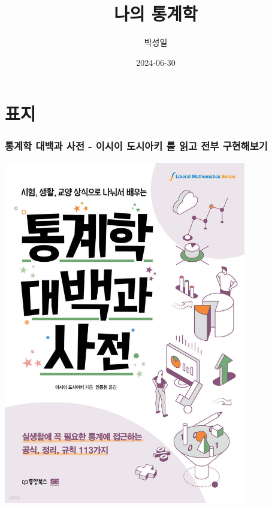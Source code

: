 \documentclass[
  letterpaper,
  DIV=11,
  numbers=noendperiod]{scrreprt}
\title{나의 통계학}
\author{박성일}
\date{2024-06-30}
\renewcommand*\contentsname{Table of contents}
\newcommand\contentsname{Table of contents}
\begin{document}
\maketitle
\ifdefined\Shaded\renewenvironment{Shaded}{\begin{tcolorbox}[borderline west={3pt}{0pt}{shadecolor}, boxrule=0pt, interior hidden, enhanced, breakable, frame hidden, sharp corners]}{\end{tcolorbox}}\fi

\renewcommand*\contentsname{Table of contents}
{
\hypersetup{linkcolor=}
\setcounter{tocdepth}{2}
\tableofcontents
}

\hypertarget{uxd45cuxc9c0}{%
\chapter*{표지}\label{uxd45cuxc9c0}}


\hypertarget{uxd1b5uxacc4uxd559-uxb300uxbc31uxacfc-uxc0acuxc804---uxc774uxc2dcuxc774-uxb3c4uxc2dcuxc544uxd0a4-uxb97c-uxc77duxace0-uxc804uxbd80-uxad6cuxd604uxd574uxbcf4uxae30}{%
\subsection*{통계학 대백과 사전 - 이시이 도시아키 를 읽고 전부
구현해보기}\label{uxd1b5uxacc4uxd559-uxb300uxbc31uxacfc-uxc0acuxc804---uxc774uxc2dcuxc774-uxb3c4uxc2dcuxc544uxd0a4-uxb97c-uxc77duxace0-uxc804uxbd80-uxad6cuxd604uxd574uxbcf4uxae30}}

\includegraphics[width=4.16667in,height=\textheight]{pyoji.jpeg}
\end{document}
